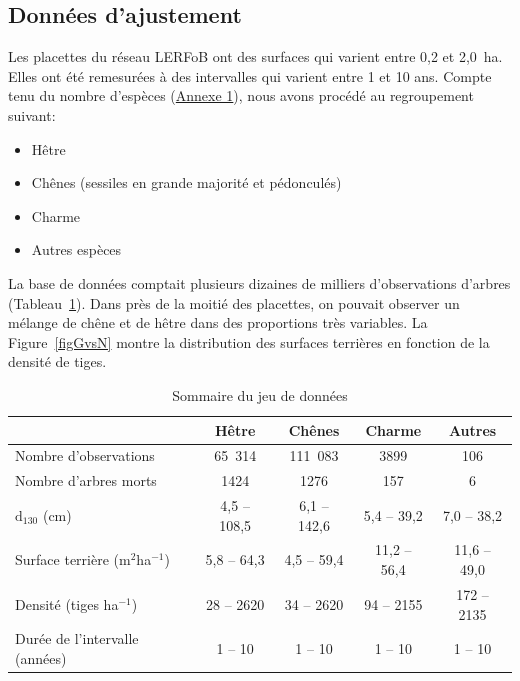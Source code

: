 \documentclass[a4paper,12pt]{article}
\begin{document}
\subsection{Données d'ajustement}

Les placettes du réseau LERFoB ont des surfaces qui varient entre 0,2 et 2,0~ha. Elles ont été remesurées à des intervalles qui varient entre 1 et 10 ans. Compte tenu du nombre d'espèces (\hyperref[Annexe1]{Annexe 1}), nous avons procédé au regroupement suivant:

\begin{itemize}
  \item Hêtre
  \item Chênes (sessiles en grande majorité et pédonculés)
  \item Charme
  \item Autres espèces
\end{itemize}

La base de données comptait plusieurs dizaines de milliers d'observations d'arbres (Tableau~\ref{tableSommaireData}). Dans près de la moitié des placettes, on pouvait observer un mélange de chêne et de hêtre dans des proportions très variables. La Figure~\ref{figGvsN} montre la distribution des surfaces terrières en fonction de la densité de tiges.

\begin{table}[h]
\begin{center}
\caption{Sommaire du jeu de données}
\label{tableSommaireData}
\begin{tabular}{lcccc}
\hline
	& Hêtre & Chênes & Charme & Autres \\
\hline
Nombre d'observations & 65~314 & 111~083 & 3899 & 106 \\
Nombre d'arbres morts & 1424 & 1276 & 157 & 6 \\
$\text{d}_{130}$ (cm) & 4,5 -- 108,5 & 6,1 -- 142,6 & 5,4 -- 39,2 & 7,0 -- 38,2 \\
Surface terrière (m$^2$ha$^{-1}$) & 5,8 -- 64,3 & 4,5 -- 59,4 & 11,2 -- 56,4 & 11,6 -- 49,0 \\
Densité (tiges ha$^{-1}$) & 28 -- 2620 & 34 -- 2620 & 94 -- 2155 & 172 -- 2135 \\
Durée de l'intervalle (années) & 1 -- 10 & 1 -- 10 & 1 -- 10 & 1 -- 10 \\ 
\hline
\end{tabular}
\end{center}
\end{table}
\end{document}
